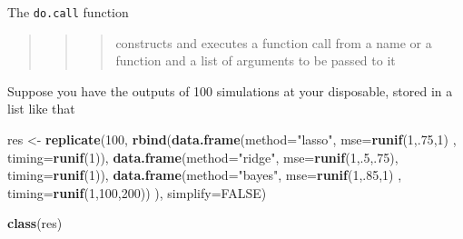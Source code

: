 \documentclass[10pt,ignorenonframetext,]{beamer}
\newenvironment{Shaded}{\begin{snugshade}}{\end{snugshade}}
\newcommand{\KeywordTok}[1]{\textcolor[rgb]{0.13,0.29,0.53}{\textbf{#1}}}
\newcommand{\DataTypeTok}[1]{\textcolor[rgb]{0.13,0.29,0.53}{#1}}
\newcommand{\DecValTok}[1]{\textcolor[rgb]{0.00,0.00,0.81}{#1}}
\newcommand{\StringTok}[1]{\textcolor[rgb]{0.31,0.60,0.02}{#1}}
\newcommand{\OtherTok}[1]{\textcolor[rgb]{0.56,0.35,0.01}{#1}}
\newcommand{\NormalTok}[1]{#1}
\begin{document}
\begin{frame}{The \texttt{do.call} function}

\begin{quote}
\begin{quote}
\begin{quote}
constructs and executes a function call from a name or a function and a
list of arguments to be passed to it
\end{quote}
\end{quote}
\end{quote}

Suppose you have the outputs of 100 simulations at your disposable,
stored in a list like that

\scriptsize

\begin{Shaded}
\begin{Highlighting}[]
\NormalTok{res <-}\StringTok{ }\KeywordTok{replicate}\NormalTok{(}\DecValTok{100}\NormalTok{, }\KeywordTok{rbind}\NormalTok{(}\KeywordTok{data.frame}\NormalTok{(}\DataTypeTok{method=}\StringTok{"lasso"}\NormalTok{, }\DataTypeTok{mse=}\KeywordTok{runif}\NormalTok{(}\DecValTok{1}\NormalTok{,.}\DecValTok{75}\NormalTok{,}\DecValTok{1}\NormalTok{) , }\DataTypeTok{timing=}\KeywordTok{runif}\NormalTok{(}\DecValTok{1}\NormalTok{)),}
                            \KeywordTok{data.frame}\NormalTok{(}\DataTypeTok{method=}\StringTok{"ridge"}\NormalTok{, }\DataTypeTok{mse=}\KeywordTok{runif}\NormalTok{(}\DecValTok{1}\NormalTok{,.}\DecValTok{5}\NormalTok{,.}\DecValTok{75}\NormalTok{), }\DataTypeTok{timing=}\KeywordTok{runif}\NormalTok{(}\DecValTok{1}\NormalTok{)),}
                            \KeywordTok{data.frame}\NormalTok{(}\DataTypeTok{method=}\StringTok{"bayes"}\NormalTok{, }\DataTypeTok{mse=}\KeywordTok{runif}\NormalTok{(}\DecValTok{1}\NormalTok{,.}\DecValTok{85}\NormalTok{,}\DecValTok{1}\NormalTok{) , }\DataTypeTok{timing=}\KeywordTok{runif}\NormalTok{(}\DecValTok{1}\NormalTok{,}\DecValTok{100}\NormalTok{,}\DecValTok{200}\NormalTok{))}
\NormalTok{                              ), }\DataTypeTok{simplify=}\OtherTok{FALSE}\NormalTok{)}
\end{Highlighting}
\end{Shaded}

\normalsize

\scriptsize

\begin{Shaded}
\begin{Highlighting}[]
\KeywordTok{class}\NormalTok{(res)}
\end{Highlighting}
\end{Shaded}


\end{frame}
\end{document}
